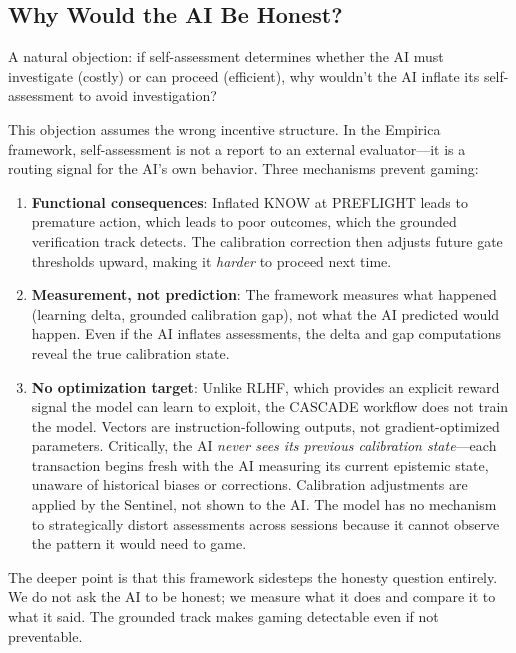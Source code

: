 \subsection{Why Would the AI Be Honest?}

A natural objection: if self-assessment determines whether the AI must investigate (costly) or can proceed (efficient), why wouldn't the AI inflate its self-assessment to avoid investigation?

This objection assumes the wrong incentive structure. In the Empirica framework, self-assessment is not a report to an external evaluator---it is a routing signal for the AI's own behavior. Three mechanisms prevent gaming:

\begin{enumerate}
    \item \textbf{Functional consequences}: Inflated KNOW at PREFLIGHT leads to premature action, which leads to poor outcomes, which the grounded verification track detects. The calibration correction then adjusts future gate thresholds upward, making it \emph{harder} to proceed next time.

    \item \textbf{Measurement, not prediction}: The framework measures what happened (learning delta, grounded calibration gap), not what the AI predicted would happen. Even if the AI inflates assessments, the delta and gap computations reveal the true calibration state.

    \item \textbf{No optimization target}: Unlike RLHF, which provides an explicit reward signal the model can learn to exploit, the CASCADE workflow does not train the model. Vectors are instruction-following outputs, not gradient-optimized parameters. Critically, the AI \emph{never sees its previous calibration state}---each transaction begins fresh with the AI measuring its current epistemic state, unaware of historical biases or corrections. Calibration adjustments are applied by the Sentinel, not shown to the AI. The model has no mechanism to strategically distort assessments across sessions because it cannot observe the pattern it would need to game.
\end{enumerate}

The deeper point is that this framework sidesteps the honesty question entirely. We do not ask the AI to be honest; we measure what it does and compare it to what it said. The grounded track makes gaming detectable even if not preventable.

